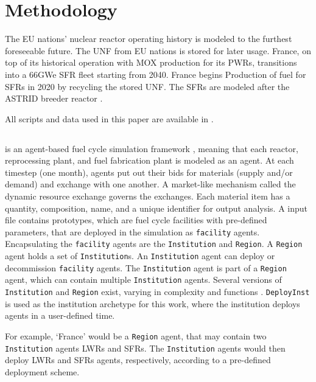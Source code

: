 
\section{Methodology}
The \gls{EU} nations' nuclear reactor operating
history is modeled to the furthest foreseeable future.
The \gls{UNF} from \gls{EU} nations is stored for later usage.
France, on top of its historical operation with \gls{MOX} production
for its \glspl{PWR}, transitions into a 66GWe \gls{SFR} fleet
starting from 2040. France begins Production of fuel for \glspl{SFR}
in 2020 by recycling the stored \gls{UNF}.
The \glspl{SFR} are modeled after the \gls{ASTRID} breeder reactor \cite{varaine_pre-conceptual_2012}.


All scripts and data used
in this paper are available in \cite{bae_arfc/transition-scenarios:_2017}.


\subsection{\Cyclus}

\Cyclus is an agent-based fuel cycle simulation framework \cite{huff_fundamental_2016}, meaning that
each reactor, reprocessing plant, and fuel fabrication plant is modeled as an agent.
At each timestep (one month),
agents put out their bids for materials (supply and/or demand) and exchange
with one another. A market-like mechanism called the dynamic resource exchange
\cite{gidden_agent-based_2015} governs the exchanges.
Each material item has a quantity, composition, name, and a unique identifier
for output analysis. 
A \Cyclus input file contains prototypes, which are fuel cycle facilities with
pre-defined parameters, that are deployed in the simulation as \texttt{facility} agents.
Encapsulating the \texttt{facility} agents are the \texttt{Institution} and \texttt{Region}.
A \texttt{Region} agent holds a set of \texttt{Institution}s. 
An \texttt{Institution} agent can deploy or decommission \texttt{facility} agents.
The \texttt{Institution} agent is part of a \texttt{Region} agent,
which can contain multiple \texttt{Institution} agents. Several versions of \texttt{Institution}
and \texttt{Region} exist, varying in complexity and functions \cite{huff_extensions_2014}.
 \texttt{DeployInst} is used as the institution archetype for this work, where the institution
deploys agents in a user-defined time. 


For example, `France' would be a \texttt{Region} agent,
that may contain two \texttt{Institution} agents \glspl{LWR}
and \glspl{SFR}. The \texttt{Institution} agents would then deploy
\glspl{LWR} and \glspl{SFR} agents, respectively, according to a pre-defined deployment
scheme. 


